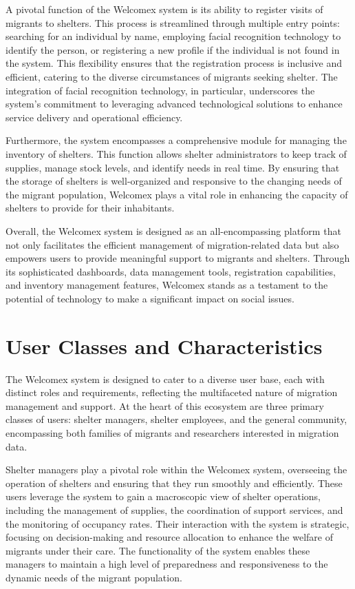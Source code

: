 \documentclass{scrreprt}
\begin{document}
A pivotal function of the Welcomex system is its ability to register visits of migrants to shelters. This process is streamlined through multiple entry points: searching for an individual by name, employing facial recognition technology to identify the person, or registering a new profile if the individual is not found in the system. This flexibility ensures that the registration process is inclusive and efficient, catering to the diverse circumstances of migrants seeking shelter. The integration of facial recognition technology, in particular, underscores the system's commitment to leveraging advanced technological solutions to enhance service delivery and operational efficiency.

Furthermore, the system encompasses a comprehensive module for managing the inventory of shelters. This function allows shelter administrators to keep track of supplies, manage stock levels, and identify needs in real time. By ensuring that the storage of shelters is well-organized and responsive to the changing needs of the migrant population, Welcomex plays a vital role in enhancing the capacity of shelters to provide for their inhabitants.

Overall, the Welcomex system is designed as an all-encompassing platform that not only facilitates the efficient management of migration-related data but also empowers users to provide meaningful support to migrants and shelters. Through its sophisticated dashboards, data management tools, registration capabilities, and inventory management features, Welcomex stands as a testament to the potential of technology to make a significant impact on social issues.

\section{User Classes and Characteristics}
The Welcomex system is designed to cater to a diverse user base, each with distinct roles and requirements, reflecting the multifaceted nature of migration management and support. At the heart of this ecosystem are three primary classes of users: shelter managers, shelter employees, and the general community, encompassing both families of migrants and researchers interested in migration data.

Shelter managers play a pivotal role within the Welcomex system, overseeing the operation of shelters and ensuring that they run smoothly and efficiently. These users leverage the system to gain a macroscopic view of shelter operations, including the management of supplies, the coordination of support services, and the monitoring of occupancy rates. Their interaction with the system is strategic, focusing on decision-making and resource allocation to enhance the welfare of migrants under their care. The functionality of the system enables these managers to maintain a high level of preparedness and responsiveness to the dynamic needs of the migrant population.
\end{document}
